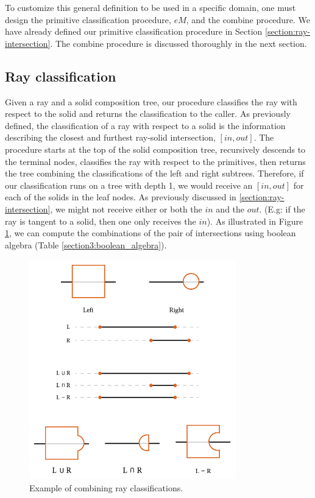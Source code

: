 \documentclass[a4paper,11pt,oneside]{article}
\begin{document}
To customize this general definition to be used in a specific domain, one must design the primitive classification procedure, $eM$, and the combine procedure. We have already defined our primitive classification procedure in Section \ref{section:ray-intersection}. The combine procedure is discussed thoroughly in the next section.

\subsection{Ray classification}
\label{sec3.3:ray-classification}

Given a ray and a solid composition tree, our procedure classifies the ray with respect to the solid and returns the classification to the caller. As previously defined, the classification of a ray with respect to a solid is the information describing the closest and furthest ray-solid intersection, $[in, out]$. The procedure starts at the top of the solid composition tree, recursively descends to the terminal nodes, classifies the ray with respect to the primitives, then returns the tree combining the classifications of the left and right subtrees. Therefore, if our classification runs on a tree with depth 1, we would receive an $[in, out]$ for each of the solids in the leaf nodes. As previously discussed in \ref{section:ray-intersection}, we might not receive either or both the $in$ and the $out$. (E.g: if the ray is tangent to a solid, then one only receives the $in$). As illustrated in Figure \ref{sec3.3:classification}, we can compute the combinations of the pair of intersections using boolean algebra (Table \ref{section3:boolean_algebra}).

\begin{figure}[ht]
	\begin{center}
		\includegraphics[width=0.8\textwidth]{section3/3.3/ray-classifications.png}
	\end{center}
	\caption{Example of combining ray classifications.}
	\label{sec3.3:classification}
\end{figure}
\end{document}
